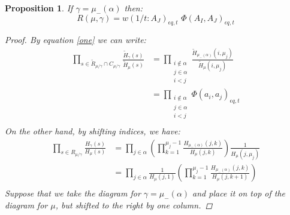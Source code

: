 \documentclass[12pt,dvips]{amsart}
\newtheorem{proposition}{Proposition}[section]
\begin{document}
\begin{proposition} \label{RHS}
If $\gamma = \mu_-(\alpha)$ then:
$$ R(\mu,\gamma) =  w(1/t : A_J)_{\epsilon q, t} \,\, \Phi(A_I,A_J)_{\epsilon q, t} $$
\begin{proof}
By equation \eqref{one} we can write:
\begin{align*}
\prod_{s \in \tilde{R}_{\mu / \gamma} \cap C_{\mu / \gamma}} \frac{\tilde{H}_\gamma(s)}{\tilde{H}_\mu(s)} 
&= \prod_{\substack{ i \not\in \alpha \\ j \in \alpha \\ i < j }} 
\frac{\tilde{H}_{\mu_-(\alpha)}(i,\mu_j )}{\tilde{H}_{\mu}(i,\mu_j)} \\
&= \prod_{\substack{ i \not\in \alpha \\ j \in \alpha \\ i < j }} \Phi(a_i, a_j)_{\epsilon q, t} \\
\end{align*}
On the other hand, by shifting indices, we have:
\begin{align*}
\prod_{s \in R_{\mu / \gamma}} \frac{H_\gamma(s)}{H_\mu(s)} &=
\prod_{j \in \alpha} \left ( \prod_{k=1}^{\mu_j - 1} \frac{H_{\mu_-(\alpha)}(j,k)}{H_\mu(j,k)}\right ) \frac{1}{H_\mu(j,\mu_j)} \\
&= \prod_{j \in \alpha} \frac{1}{H_\mu(j,1)} \left ( \prod_{k=1}^{\mu_j-1} \frac{H_{\mu_-(\alpha)}(j,k)}{H_\mu(j,k+1)}\right ) \\
\end{align*}
Suppose that we take the diagram for $\gamma = \mu_-(\alpha)$ and place it on top of the diagram for $\mu$, but shifted to the right by one column. 


\end{proof}
\end{proposition}
\end{document}
